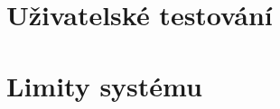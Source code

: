 
\section{Uživatelské testování}
\label{sec:uzivatelske_testovani}


%

\section{Limity systému}
\label{sec:limity}


%
%
